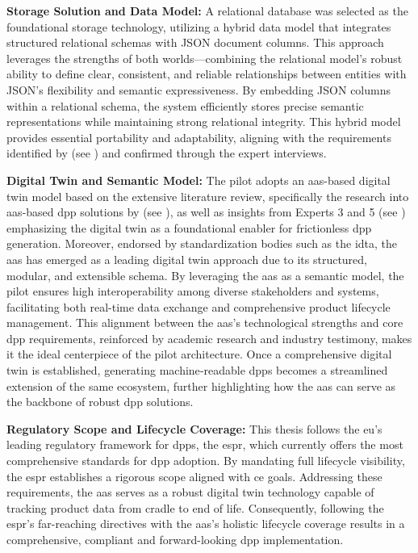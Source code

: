 \textbf{Storage Solution and Data Model:}
A relational database was selected as the foundational storage technology, utilizing a hybrid data model that integrates structured relational schemas with JSON document columns. This approach leverages the strengths of both worlds—combining the relational model's robust ability to define clear, consistent, and reliable relationships between entities with JSON's flexibility and semantic expressiveness. By embedding JSON columns within a relational schema, the system efficiently stores precise semantic representations while maintaining strong relational integrity. This hybrid model provides essential portability and adaptability, aligning with the requirements identified by \textcite{Jansen.2023} (see ) and confirmed through the expert interviews.

\textbf{Digital Twin and Semantic Model:}
The pilot adopts an \ac{aas}-based digital twin model based on the extensive literature review, specifically the research into \ac{aas}‐based \ac{dpp} solutions by \textcite{Kuhn.2025, Pourjafarian.2023} (see ), as well as insights from Experts 3 and 5 (see ) emphasizing the digital twin as a foundational enabler for frictionless \ac{dpp} generation. Moreover, endorsed by standardization bodies such as the \ac{idta}, the \ac{aas} has emerged as a leading digital twin approach due to its structured, modular, and extensible schema. By leveraging the \ac{aas} as a semantic model, the pilot ensures high interoperability among diverse stakeholders and systems, facilitating both real-time data exchange and comprehensive product lifecycle management. This alignment between the \ac{aas}’s technological strengths and core \ac{dpp} requirements, reinforced by academic research and industry testimony, makes it the ideal centerpiece of the pilot architecture. Once a comprehensive digital twin is established, generating machine‐readable \ac{dpp}s becomes a streamlined extension of the same ecosystem, further highlighting how the \ac{aas} can serve as the backbone of robust \ac{dpp} solutions.

\textbf{Regulatory Scope and Lifecycle Coverage:}
This thesis follows the \acrlong{eu}’s leading regulatory framework for \ac{dpp}s, the \ac{espr}, which currently offers the most comprehensive standards for \ac{dpp} adoption. By mandating full lifecycle visibility, the \ac{espr} establishes a rigorous scope aligned with \acrlong{ce} goals. Addressing these requirements, the \ac{aas} serves as a robust digital twin technology capable of tracking product data from cradle to end of life. Consequently, following the \ac{espr}’s far-reaching directives with the \ac{aas}’s holistic lifecycle coverage results in a comprehensive, compliant and forward-looking \ac{dpp} implementation.

